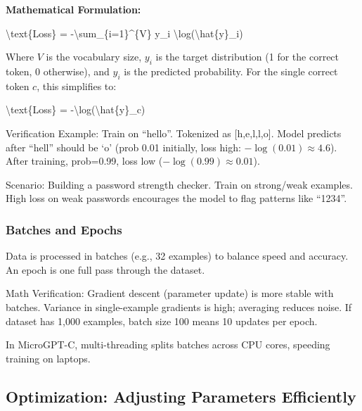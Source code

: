 \documentclass[
]{article}
\newenvironment{Shaded}{}{}
\newcommand{\NormalTok}[1]{#1}
\begin{document}
\textbf{Mathematical Formulation:}

\begin{Shaded}
\begin{Highlighting}[]
\NormalTok{\textbackslash{}text\{Loss\} = {-}\textbackslash{}sum\_\{i=1\}\^{}\{V\} y\_i \textbackslash{}log(\textbackslash{}hat\{y\}\_i)}
\end{Highlighting}
\end{Shaded}

Where \(V\) is the vocabulary size, \(y_i\) is the target distribution
(1 for the correct token, 0 otherwise), and \(\hat{y}_i\) is the
predicted probability. For the single correct token \(c\), this
simplifies to:

\begin{Shaded}
\begin{Highlighting}[]
\NormalTok{\textbackslash{}text\{Loss\} = {-}\textbackslash{}log(\textbackslash{}hat\{y\}\_c)}
\end{Highlighting}
\end{Shaded}

Verification Example: Train on ``hello''. Tokenized as {[}h,e,l,l,o{]}.
Model predicts after ``hell'' should be `o' (prob 0.01 initially, loss
high: \(-\log(0.01) \approx 4.6\)). After training, prob=0.99, loss low
(\(-\log(0.99) \approx 0.01\)).

Scenario: Building a password strength checker. Train on strong/weak
examples. High loss on weak passwords encourages the model to flag
patterns like ``1234''.

\subsubsection{Batches and Epochs}\label{batches-and-epochs}

Data is processed in batches (e.g., 32 examples) to balance speed and
accuracy. An epoch is one full pass through the dataset.

Math Verification: Gradient descent (parameter update) is more stable
with batches. Variance in single-example gradients is high; averaging
reduces noise. If dataset has 1,000 examples, batch size 100 means 10
updates per epoch.

In MicroGPT-C, multi-threading splits batches across CPU cores, speeding
training on laptops.

\subsection{Optimization: Adjusting Parameters
Efficiently}\label{optimization-adjusting-parameters-efficiently}
\end{document}
